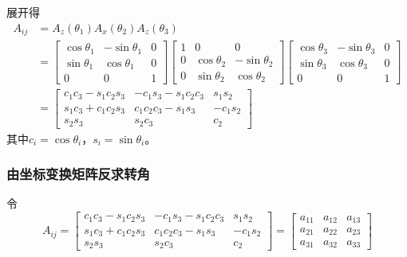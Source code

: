 展开得
\begin{align}
A_{ij} &= A_z(\theta_1)A_x(\theta_2)A_z(\theta_3) \nonumber\\
&= \begin{bmatrix}
\cos\theta_1 & -\sin\theta_1 & 0 \\
\sin\theta_1 & \cos\theta_1  & 0 \\
0            & 0            & 1
\end{bmatrix}
\begin{bmatrix}
1 & 0             & 0             \\
0 & \cos\theta_2  & -\sin\theta_2  \\
0 & \sin\theta_2  & \cos\theta_2
\end{bmatrix}
\begin{bmatrix}
\cos\theta_3  & -\sin\theta_3 & 0 \\
\sin\theta_3  & \cos\theta_3  & 0 \\
0            & 0            & 1
\end{bmatrix} \nonumber\\
&= \begin{bmatrix}
c_1c_3 - s_1c_2s_3  & -c_1s_3 - s_1c_2c_3  & s_1s_2    \\[3pt]
s_1c_3 + c_1c_2s_3  & c_1c_2c_3 - s_1s_3   & -c_1s_2   \\[3pt]
s_2s_3              & s_2c_3               & c_2
\end{bmatrix}
\label{eq:7.12}
\end{align}
其中$c_i = \cos\theta_i$，$s_i = \sin\theta_i$。

\subsubsection*{由坐标变换矩阵反求转角}

令
\begin{equation}
A_{ij} =
\begin{bmatrix}
c_1c_3 - s_1c_2s_3  & -c_1s_3 - s_1c_2c_3  & s_1s_2  \\
s_1c_3 + c_1c_2s_3  & c_1c_2c_3 - s_1s_3   & -c_1s_2 \\
s_2s_3              & s_2c_3               & c_2
\end{bmatrix}
=
\begin{bmatrix}
a_{11} & a_{12} & a_{13} \\ a_{21} & a_{22} & a_{23} \\ a_{31} & a_{32} & a_{33}
\end{bmatrix}
\end{equation}

